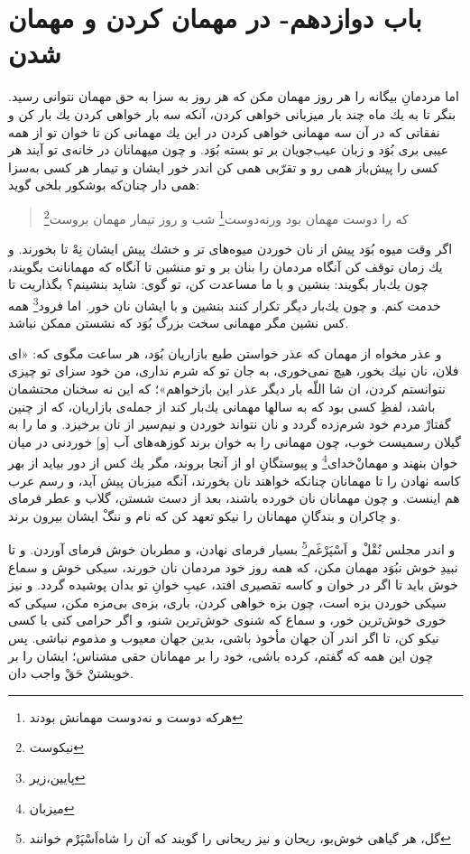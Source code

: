 \section*{باب دوازدهم- 
در مهمان كردن و مهمان شدن}

اما مردمانِ بيگانه را هر روز مهمان مكن كه هر روز به‌ سزا به حق مهمان نتوانى رسيد. بنگر تا به يك ماه چند بار ميزبانى خواهى كردن، آنكه سه بار خواهى كردن يك بار كن و نفقاتى كه در آن سه مهمانى خواهى كردن در اين يك مهمانى كن تا خوان تو از همه عيبى برى بُوَد و زبان عيب‌جويان بر تو بسته بُوَد. و چون ميهمانان در خانه‌ی تو آيند هر كسى را پيش‌باز همى رو و تقرّبى همى كن اندر خور ايشان و تيمار هر كسى به‌سزا همى دار چنان‌كه بوشكور بلخى گويد:


\begin{quote}
\centering
كه را دوست مهمان بود ورنه‌دوست\footnote{هرکه دوست و نه‌دوست مهمانش بودند}  \quad \quad 
شب و روز تيمار مهمان بروست\footnote{نیکوست}
\end{quote}

اگر وقت ميوه بُوَد پيش از نان خوردن ميوه‌هاى تر و خشك پيش ايشان نِهْ تا بخورند. و يك زمان توقف كن آنگاه مردمان را بنان بر و تو منشين تا آنگاه كه مهمانانت بگويند، چون يك‌بار بگويند: بنشين و با ما مساعدت كن، تو گوى: شايد بنشينم‌؟ بگذاريت تا خدمت كنم. و چون يك‌بار ديگر تكرار كنند بنشين و با ايشان نان خور. اما فرود\footnote{پایین،زیر} همه كس نشين مگر مهمانى سخت بزرگ بُوَد كه نشستن ممكن نباشد.

و عذر مخواه از مهمان كه عذر خواستن طبع بازاريان بُوَد، هر ساعت مگوى كه: «اى فلان، نان نيك بخور، هيچ نمى‌خورى، به جان تو كه شرم ندارى، من خود سزاى تو چيزى نتوانستم كردن، ان شا  اللّه بار ديگر عذر اين باز‌خواهم»؛ كه اين نه سخنان محتشمان باشد، لفظِ كسى بود كه به سالها مهمانى يك‌بار كند از جمله‌ی بازاريان، كه از چنين گفتارْ مردم خود شرم‌زده گردد و نان نتواند خوردن و نيم‌سير از نان برخيزد. و ما را به گيلان رسميست خوب، چون مهمانى را به خوان برند كوزهه‌هاى آب [و] خوردنى در ميان خوان بنهند و مهمانْ‌خداى\footnote{میزبان} و پيوستگانِ او از آنجا بروند، مگر يك كس از دور بيايد از بهر كاسه نهادن را تا مهمانان چنانكه خواهند نان بخورند، آنگه ميزبان پيش آيد، و رسم عرب هم اينست. و چون مهمانان نان خورده باشند، بعد از دست شستن، گلاب و عطر فرماى و چاكران و بندگانِ مهمانان را نيكو تعهد كن كه نام و ننگْ ايشان بيرون برند.

و اندر مجلس نُقْلْ و اَسْپَرْغَم\footnote{گل، هر گیاهی خوش‌بو، ریحان و نیز ریحانی را گویند که آن را شاه‌اَسْپَرْم خوانند} بسيار فرماى نهادن، و مطربان خوش فرماى آوردن. و تا نبيدِ خوش نبُوَد مهمان مكن، كه همه روز خود مردمان نان خورند، سيكى خوش و سماع خوش بايد تا اگر در خوان و كاسه تقصيرى افتد، عيبِ خوانِ تو بدان پوشيده گردد. و نيز سيكى خوردن بزه است، چون بزه خواهى كردن، بارى، بزه‌ی بى‌مزه مكن، سيكى كه خورى خوش‌ترين خور، و سماع كه شنوى خوش‌ترين شنو، و اگر حرامى كنى با كسى نيكو كن، تا اگر اندر آن جهان مأخوذ باشى، بدين جهان معيوب و مذموم نباشى. پس چون اين همه كه گفتم، كرده باشى، خود را بر مهمانان حقى مشناس؛ ايشان را بر خويشتنْ حَقْ واجب دان.


